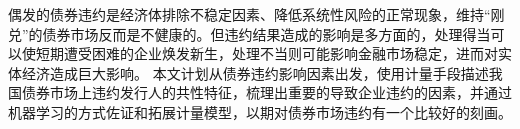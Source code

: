 \begin{cabstract}
	偶发的债券违约是经济体排除不稳定因素、降低系统性风险的正常现象，维持“刚兑”的债券市场反而是不健康的。但违约结果造成的影响是多方面的，处理得当可以使短期遭受困难的企业焕发新生，处理不当则可能影响金融市场稳定，进而对实体经济造成巨大影响。
	本文计划从债券违约影响因素出发，使用计量手段描述我国债券市场上违约发行人的共性特征，梳理出重要的导致企业违约的因素，并通过机器学习的方式佐证和拓展计量模型，以期对债券市场违约有一个比较好的刻画。
\end{cabstract}

\begin{eabstract}
\end{eabstract}
